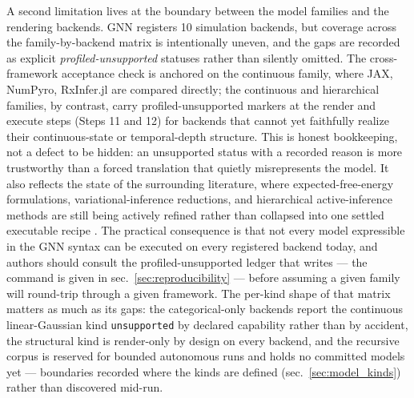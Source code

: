 \documentclass[
  english,
  9pt,
]{extarticle}
\begin{document}
A second limitation lives at the boundary between the model families and
the rendering backends. GNN registers 10 simulation backends, but
coverage across the family-by-backend matrix is intentionally uneven,
and the gaps are recorded as explicit \emph{profiled-unsupported}
statuses rather than silently omitted. The cross-framework acceptance
check is anchored on the continuous family, where JAX, NumPyro,
RxInfer.jl are compared directly; the continuous and hierarchical
families, by contrast, carry profiled-unsupported markers at the render
and execute steps (Steps 11 and 12) for backends that cannot yet
faithfully realize their continuous-state or temporal-depth structure.
This is honest bookkeeping, not a defect to be hidden: an unsupported
status with a recorded reason is more trustworthy than a forced
translation that quietly misrepresents the model. It also reflects the
state of the surrounding literature, where expected-free-energy
formulations, variational-inference reductions, and hierarchical
active-inference methods are still being actively refined rather than
collapsed into one settled executable recipe
\citep{champion2024reframingEfe, nuijten2026typeInference, rangarajan2026hierarchicalSuccessor}.
The practical consequence is that not every model expressible in the GNN
syntax can be executed on every registered backend today, and authors
should consult the profiled-unsupported ledger that
 writes --- the
command is given in sec.~\ref{sec:reproducibility} --- before assuming a
given family will round-trip through a given framework. The per-kind
shape of that matrix matters as much as its gaps: the categorical-only
backends report the continuous linear-Gaussian kind \texttt{unsupported}
by declared capability rather than by accident, the structural kind is
render-only by design on every backend, and the recursive corpus is
reserved for bounded autonomous runs and holds no committed models yet
--- boundaries recorded where the kinds are defined
(sec.~\ref{sec:model_kinds}) rather than discovered mid-run.
\end{document}
